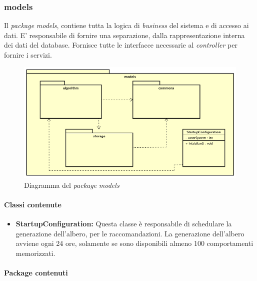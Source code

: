 \subsubsection{models}
Il \emph{package} \emph{models}, contiene tutta la logica di \emph{business} del sistema e di accesso ai dati. E' responsabile di fornire una separazione, dalla rappresentazione interna dei dati del database. Fornisce tutte le interfacce necessarie al \emph{controller} per fornire i servizi.
\begin{figure}[h]
\centering
\includegraphics[scale=0.30]{immagini/models}
\caption{Diagramma del \emph{package} \emph{models}}
\label{fig:pack-models}
\end{figure}
\paragraph{Classi contenute}
\begin{itemize}
\item \textbf{StartupConfiguration:} Questa classe è responsabile di schedulare la generazione dell'albero, per le raccomandazioni. La generazione dell'albero avviene ogni 24 ore, solamente se sono disponibili almeno 100 comportamenti memorizzati.
\end{itemize}
\newpage
\paragraph{Package contenuti}
